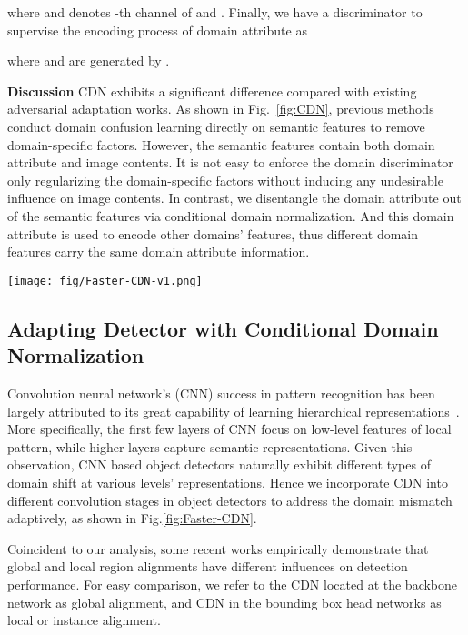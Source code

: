 \documentclass[runningheads]{llncs}
\begin{document}
where  and  denotes -th channel of  and . Finally, we have a discriminator to supervise the encoding process of domain attribute as

where  and  are generated by .


\textbf{Discussion}
CDN exhibits a significant difference compared with existing adversarial adaptation works.
As shown in Fig.~\ref{fig:CDN},
previous methods conduct domain confusion learning directly on semantic features to remove domain-specific factors.
However, the semantic features contain both domain attribute and image contents.
It is not easy to enforce the domain discriminator only regularizing the domain-specific factors without inducing any undesirable influence on image contents.
In contrast, we disentangle the domain attribute out of the semantic features via conditional domain normalization.
And this domain attribute is used to encode other domains' features, thus  different  domain features carry the same domain attribute information.


\begin{figure*}[!t]
\setlength{\textfloatsep}{8pt}
\begin{center}
  \texttt{[image: fig/Faster-CDN-v1.png]}
  \caption{Faster R-CNN network incorporates with CDN.
  The CDN is adopted in both backbone network and bounding box head network to adaptively address the domain shift at different representation levels.
}
  \label{fig:Faster-CDN}
\end{center}
\end{figure*}


\subsection{Adapting Detector with Conditional Domain Normalization} \label{sec: 3.3}
Convolution neural network's (CNN) success in pattern recognition has been largely attributed to its great capability of learning hierarchical representations~\cite{yosinski2015understanding}.
More specifically, the first few layers of CNN focus on low-level features of local pattern, while higher layers capture semantic representations.
Given this observation, CNN based object detectors naturally exhibit different types of domain shift at various levels' representations.
Hence we incorporate CDN into different convolution stages in object detectors to address the  domain mismatch adaptively, as shown in Fig.\ref{fig:Faster-CDN}.

Coincident to our analysis, some recent works \cite{Saito_2019_CVPR,Zhu_2019_CVPR} empirically demonstrate that global and local region alignments have different influences on detection performance.
For easy comparison, we refer to the CDN located at the backbone network as global alignment, and CDN in the bounding box head networks as local or instance alignment.
\end{document}

